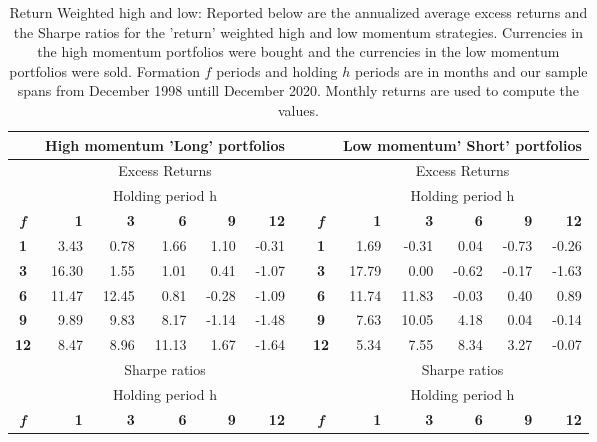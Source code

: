\documentclass{article}
\begin{document}
\begin{table}[htbp]
  \centering
  \caption{Return Weighted high and low: Reported below are the annualized average excess returns and the Sharpe ratios for the 'return' weighted high and low momentum strategies. Currencies in the high momentum portfolios were bought and the currencies in the low momentum portfolios were sold. Formation $f$ periods and holding $h$ periods are in months and our sample spans from December 1998 untill December 2020. Monthly returns are used to compute the values.}
    \begin{tabular}{crrrrrrcrrrrr}
          & \multicolumn{5}{c}{\textbf{High momentum 'Long' portfolios}} &       &       & \multicolumn{5}{c}{\textbf{Low momentum' Short' portfolios}} \\
    \midrule
          & \multicolumn{5}{c}{Excess Returns}    &       &       & \multicolumn{5}{c}{Excess Returns} \\
\cmidrule{2-6}\cmidrule{9-13}          & \multicolumn{5}{c}{Holding period h}  &       &       & \multicolumn{5}{c}{Holding period h} \\
    \textit{\textbf{f}} & \textbf{1} & \textbf{3} & \textbf{6} & \textbf{9} & \textbf{12} &       & \textit{\textbf{f}} & \textbf{1} & \textbf{3} & \textbf{6} & \textbf{9} & \textbf{12} \\
\cmidrule{2-6}\cmidrule{9-13}    \textbf{1} & 3.43  & 0.78  & 1.66  & 1.10  & -0.31 &       & \textbf{1} & 1.69  & -0.31 & 0.04  & -0.73 & -0.26 \\
    \textbf{3} & 16.30 & 1.55  & 1.01  & 0.41  & -1.07 &       & \textbf{3} & 17.79 & 0.00  & -0.62 & -0.17 & -1.63 \\
    \textbf{6} & 11.47 & 12.45 & 0.81  & -0.28 & -1.09 &       & \textbf{6} & 11.74 & 11.83 & -0.03 & 0.40  & 0.89 \\
    \textbf{9} & 9.89  & 9.83  & 8.17  & -1.14 & -1.48 &       & \textbf{9} & 7.63  & 10.05 & 4.18  & 0.04  & -0.14 \\
    \textbf{12} & 8.47  & 8.96  & 11.13 & 1.67  & -1.64 &       & \textbf{12} & 5.34  & 7.55  & 8.34  & 3.27  & -0.07 \\
    \midrule
          & \multicolumn{5}{c}{Sharpe ratios}     &       &       & \multicolumn{5}{c}{Sharpe ratios} \\
    \midrule
          & \multicolumn{5}{c}{Holding period h}  &       &       & \multicolumn{5}{c}{Holding period h} \\
    \textit{\textbf{f}} & \textbf{1} & \textbf{3} & \textbf{6} & \textbf{9} & \textbf{12} &       & \textit{\textbf{f}} & \textbf{1} & \textbf{3} & \textbf{6} & \textbf{9} & \textbf{12} \\

\end{tabular}
\end{table}
\end{document}
